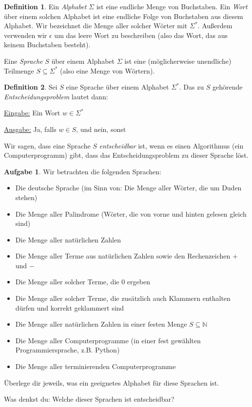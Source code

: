 \documentclass[a4paper,ngerman,12pt]{scrartcl}
\newcommand{\IN}{\mathbb{N}}
\theoremstyle{definition}
\newtheorem{defn}{Definition}[]
\newtheorem{aufg}{Aufgabe}
\theoremstyle{plain}
\theoremstyle{remark}
\begin{document}
\begin{defn}
	Ein \emph{Alphabet} $\Sigma$ ist eine endliche Menge von Buchstaben. Ein \emph{Wort} über einem solchen Alphabet ist eine endliche Folge von Buchstaben aus diesem Alphabet. Wir bezeichnet die Menge aller solcher Wörter mit $\Sigma^*$. Außerdem verwenden wir $\epsilon$ um das leere Wort zu beschreiben (also das Wort, das aus keinem Buchstaben besteht).
	
	Eine \emph{Sprache} $S$ über einem Alphabet $\Sigma$ ist eine (möglicherweise unendliche) Teilmenge $S \subseteq \Sigma^*$ (also eine Menge von Wörtern).
\end{defn}

\begin{defn}
	Sei $S$ eine Sprache über einem Alphabet $\Sigma^*$. Das zu $S$ gehörende \emph{Entscheidungsproblem} lautet dann:
	
	\underline{Eingabe:} Ein Wort $w \in \Sigma^*$
	
	\underline{Ausgabe:} Ja, falls $w \in S$, und nein, sonst
	
	Wir sagen, dass eine Sprache $S$ \emph{entscheidbar} ist, wenn es einen Algorithmus (ein Computerprogramm) gibt, dass das Entscheidungsproblem zu dieser Sprache löst.
\end{defn}

\begin{aufg}
	Wir betrachten die folgenden Sprachen:
	\begin{itemize}
		\item Die deutsche Sprache (im Sinn von: Die Menge aller Wörter, die um Duden stehen)
		\item Die Menge aller Palindrome (Wörter, die von vorne und hinten gelesen gleich sind)
		\item Die Menge aller natürlichen Zahlen
		\item Die Menge aller Terme aus natürlichen Zahlen sowie den Rechenzeichen $+$ und $-$
		\item Die Menge aller solcher Terme, die $0$ ergeben
		\item Die Menge aller solcher Terme, die zusätzlich auch Klammern enthalten dürfen und korrekt geklammert sind
		\item Die Menge aller natürlichen Zahlen in einer festen Menge $S \subseteq \IN$
		\item Die Menge aller Computerprogramme (in einer fest gewählten Programmiersprache, z.B. Python)
		\item Die Menge aller terminierenden Computerprogramme
	\end{itemize}
	Überlege dir jeweils, was ein geeignetes Alphabet für diese Sprachen ist.
	
	Was denkst du: Welche dieser Sprachen ist entscheidbar?
\end{aufg}
\end{document}
